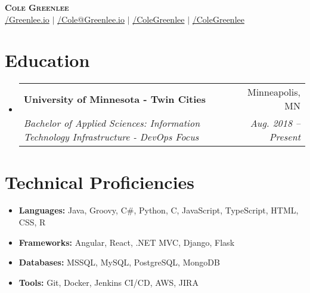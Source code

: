 \documentclass[letterpaper,11pt]{article}
\makeatletter
\newcommand{\techSkillItem}[2]{\item{\small{\textbf{#1: }{#2}}}\vspace{-5pt}}
\newcommand{\techSkillList}[1]{\begin{itemize}[leftmargin=0.15in]#1\end{itemize}\vspace{-15pt}}
\newcommand{\resumeSection}[2]{\section{#1}\begin{itemize}[leftmargin=0.15in, label={}]#2\end{itemize}}
\newcommand{\resumeItemHeading}[4]{\vspace{-2pt}\item{\begin{tabular*}{0.97\textwidth}[t]{l@{\extracolsep{\fill}}r}\textbf{#1} & #2\\\textit{\small#3} & \textit{\small #4}\\\end{tabular*}\vspace{-7pt}}}
\makeatother
\begin{document}
\begin{center}
	\begin{small}
		\textbf{\Huge \scshape Cole Greenlee} \\ \vspace{5pt}
		\href{https://Greenlee.io/}{\faGlobe/Greenlee.io}  $|$
		\href{mailto:Cole@Greenlee.io}{\faEnvelope[regular]/Cole@Greenlee.io} $|$
		\href{https://LinkedIn.com/in/ColeGreenlee}{\faLinkedin/ColeGreenlee} $|$
		\href{https://GitHub.com/ColeGreenlee}{\faGithub/ColeGreenlee}
	\end{small}
\end{center}

\resumeSection{Education}{
	\resumeItemHeading{University of Minnesota - Twin Cities}{Minneapolis, MN}{Bachelor of Applied Sciences: Information Technology Infrastructure - DevOps Focus}{Aug. 2018 -- Present}
}

\section{Technical Proficiencies}
\techSkillList{
	\techSkillItem{Languages}{Java, Groovy, C\#, Python, C, JavaScript, TypeScript, HTML, CSS, R}
	\techSkillItem{Frameworks}{Angular, React, .NET MVC, Django, Flask}
	\techSkillItem{Databases}{MSSQL, MySQL, PostgreSQL, MongoDB}
	\techSkillItem{Tools}{Git, Docker, Jenkins CI/CD, AWS, JIRA}
}
\end{document}
